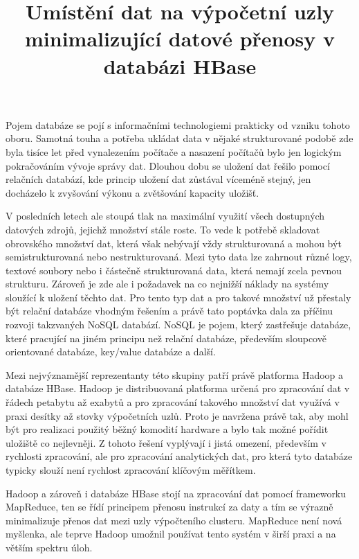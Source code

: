 \documentclass[thesis=M,czech]{FITthesis}[2012/06/26]
\title{Umístění dat na výpočetní uzly minimalizující datové přenosy v databázi HBase}
\begin{document}
\lstset{language=sh}  

\begin{introduction}
Pojem databáze se pojí s informačními technologiemi prakticky od vzniku tohoto oboru. Samotná touha a potřeba ukládat data v nějaké strukturované podobě zde byla tisíce let před vynalezením počítače a nasazení počítačů bylo jen logickým pokračováním vývoje správy dat. Dlouhou dobu se uložení dat řešilo pomocí relačních databází, kde princip uložení dat zůstával víceméně stejný, jen docházelo k zvyšování výkonu a zvětšování kapacity uložišť.

 V posledních letech ale stoupá tlak na maximální využití všech dostupných datových zdrojů, jejichž množství stále roste. To vede k potřebě skladovat obrovského množství dat, která však nebývají vždy strukturovaná a mohou být semistrukturovaná nebo nestrukturovaná. Mezi tyto data lze zahrnout různé logy, textové soubory nebo i částečně strukturovaná data, která nemají zcela pevnou strukturu. Zároveň je zde ale i požadavek na co nejnižší náklady na systémy sloužící k uložení těchto dat. Pro tento typ dat a pro takové množství už přestaly být relační databáze vhodným řešením a právě tato poptávka dala za příčinu rozvoji takzvaných NoSQL databází. NoSQL je pojem, který zastřešuje databáze, které pracující na jiném principu než relační databáze, především sloupcově orientované databáze, key/value databáze a další. 
 
 
Mezi nejvýznamější reprezentanty této skupiny patří právě platforma Hadoop a databáze HBase. Hadoop je distribuovaná platforma určená pro zpracování dat v řádech petabytu až exabytů a pro zpracování takového množství dat využívá v praxi desítky až stovky výpočetních uzlů. Proto je navržena právě tak, aby mohl být pro realizaci použitý běžný komodití hardware a bylo tak možné pořídit uložiště co nejlevněji. Z tohoto řešení vyplývají i jistá omezení, především v rychlosti zpracování, ale pro zpracování analytických dat, pro která tyto databáze typicky slouží není rychlost zpracování klíčovým měřítkem.


Hadoop a zároveň i databáze HBase stojí na zpracování dat pomocí frameworku MapReduce, ten se řídí principem přenosu instrukcí za daty a tím se výrazně minimalizuje přenos dat mezi uzly výpočteního clusteru. MapReduce není nová myšlenka, ale teprve Hadoop umožnil používat tento systém v širší praxi a na větším spektru úloh.



\end{introduction}
\end{document}
